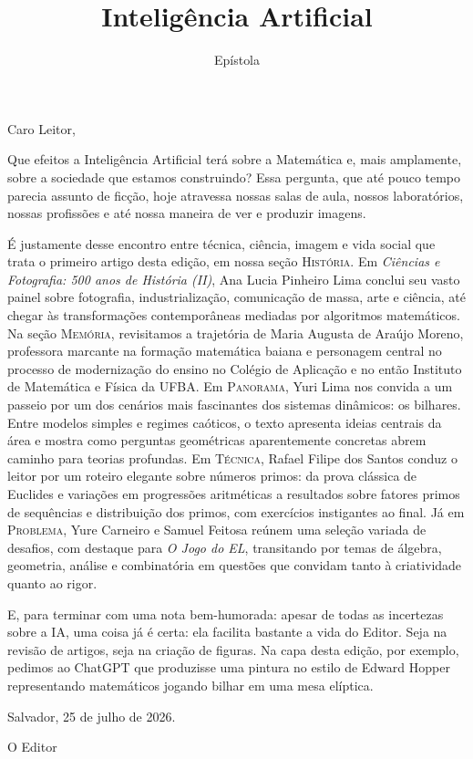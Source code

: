 \documentclass[onecolumn]{hipatia}
\title{Inteligência Artificial}
\subtitle{Epístola}
\author{}
\begin{document}
\setcounter{page}{\epistolapage}
\maketitle
\leftskip=2.4cm
\rightskip=2.4cm

\noindent Caro Leitor,
\vspace{0.4cm}

\noindent Que efeitos a Inteligência Artificial terá sobre a Matemática e, mais amplamente, sobre a sociedade que estamos construindo? Essa pergunta, que até pouco tempo parecia assunto de ficção, hoje atravessa nossas salas de aula, nossos laboratórios, nossas profissões e até nossa maneira de ver e produzir imagens.

\noindent É justamente desse encontro entre técnica, ciência, imagem e vida social que trata o primeiro artigo desta edição, em nossa seção \textsc{História}. Em \textit{Ciências e Fotografia: 500 anos de História (II)}, Ana Lucia Pinheiro Lima conclui seu vasto painel sobre fotografia, industrialização, comunicação de massa, arte e ciência, até chegar às transformações contemporâneas mediadas por algoritmos matemáticos.
Na seção \textsc{Memória}, revisitamos a trajetória de Maria Augusta de Araújo Moreno, professora marcante na formação matemática baiana e personagem central no processo de modernização do ensino no Colégio de Aplicação e no então Instituto de Matemática e Física da UFBA.
Em \textsc{Panorama}, Yuri Lima nos convida a um passeio por um dos cenários mais fascinantes dos sistemas dinâmicos: os bilhares. Entre modelos simples e regimes caóticos, o texto apresenta ideias centrais da área e mostra como perguntas geométricas aparentemente concretas abrem caminho para teorias profundas.
Em \textsc{Técnica}, Rafael Filipe dos Santos conduz o leitor por um roteiro elegante sobre números primos: da prova clássica de Euclides e variações em progressões aritméticas a resultados sobre fatores primos de sequências e distribuição dos primos, com exercícios instigantes ao final.
Já em \textsc{Problema}, Yure Carneiro e Samuel Feitosa reúnem uma seleção variada de desafios, com destaque para \textit{O Jogo do EL}, transitando por temas de álgebra, geometria, análise e combinatória em questões que convidam tanto à criatividade quanto ao rigor.

\noindent E, para terminar com uma nota bem-humorada: apesar de todas as incertezas sobre a IA, uma coisa já é certa: ela facilita bastante a vida do Editor. Seja na revisão de artigos, seja na criação de figuras. Na capa desta edição, por exemplo, pedimos ao ChatGPT que produzisse uma pintura no estilo de Edward Hopper representando matemáticos jogando bilhar em uma mesa elíptica.

\vspace{0.6cm}

\hfill Salvador, 25 de julho de 2026.

\hfill O Editor
\end{document}
